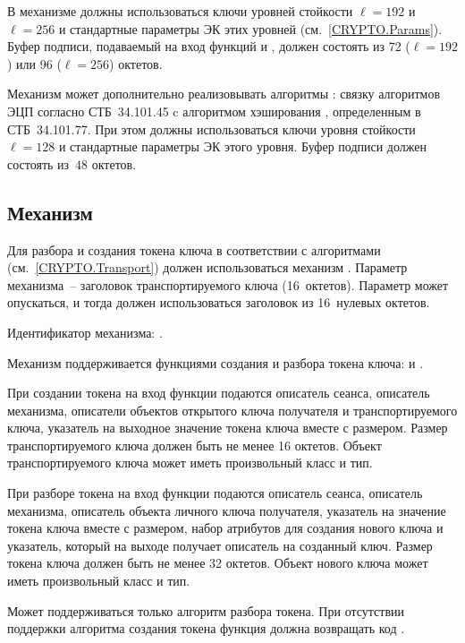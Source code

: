 В механизме должны использоваться ключи уровней стойкости $\ell=192$
и~$\ell=256$ и стандартные параметры ЭК этих уровней (см.~\ref{CRYPTO.Params}).
% 
Буфер подписи, подаваемый на вход функций  и
, должен состоять из 72 ($\ell=192$) или 96 ($\ell=256$)
октетов.

Механизм может дополнительно реализовывать алгоритмы 
: связку алгоритмов ЭЦП согласно СТБ~34.101.45 c 
алгоритмом хэширования , определенным в СТБ~34.101.77.
При этом должны использоваться ключи уровня стойкости~$\ell=128$ и стандартные
параметры ЭК этого уровня. Буфер подписи должен состоять из~$48$ октетов.

\subsection{Механизм }\label{CRYPTOKI.Transport}

Для разбора и создания токена ключа в соответствии с
алгоритмами~ (см.~\ref{CRYPTO.Transport}) должен
использоваться механизм .
%
Параметр механизма~-- заголовок транспортируемого ключа (16~октетов). Параметр
может опускаться, и тогда должен использоваться заголовок из 16~нулевых октетов.

Идентификатор механизма: .

Механизм поддерживается функциями создания и разбора токена ключа:
 и .

При создании токена на вход функции  подаются
описатель сеанса, описатель механизма, описатели объектов открытого ключа
получателя и транспортируемого ключа, указатель на
выходное значение токена ключа вместе с размером.
Размер транспортируемого ключа должен быть не менее 16 октетов.
Объект транспортируемого ключа может иметь произвольный класс и тип.

При разборе токена на вход функции  подаются
описатель сеанса, описатель механизма, описатель объекта личного ключа
получателя, указатель на значение токена ключа вместе с размером,
набор атрибутов для создания нового ключа и указатель,
который на выходе получает описатель на созданный ключ.
Размер токена ключа должен быть не менее 32 октетов.
Объект нового ключа может иметь произвольный класс и тип.

Может поддерживаться только алгоритм разбора токена.
При отсутствии поддержки алгоритма создания токена
функция  должна возвращать код 
.

